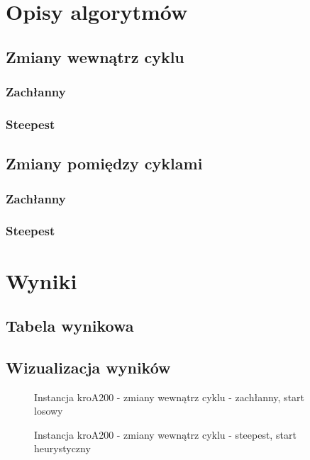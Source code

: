 \documentclass[11pt]{article}
\begin{document}
\section{Opisy algorytmów}\label{sec:opisy-alg}
\subsection{Zmiany wewnątrz cyklu}
\subsubsection{Zachłanny}


\subsubsection{Steepest}


\subsection{Zmiany pomiędzy cyklami}
\subsubsection{Zachłanny}


\subsubsection{Steepest}


\section{Wyniki}
\subsection{Tabela wynikowa}

\subsection{Wizualizacja wyników}
\begin{figure}[H]
    \centering
    \caption{Instancja kroA200 - zmiany wewnątrz cyklu - zachłanny, start losowy}
    \label{fig:Greedy-cycle-changes-kroA-random}
\end{figure}

\begin{figure}[H]
    \centering
    \caption{Instancja kroA200 - zmiany wewnątrz cyklu - steepest, start heurystyczny}
    \label{fig:Steepest-cycle-changes-kroA-heuristic}
\end{figure}
\end{document}
